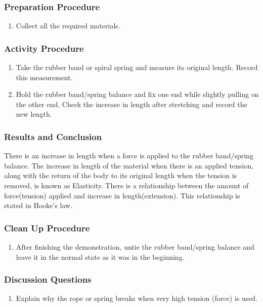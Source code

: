\subsubsection*{Preparation Procedure}
\begin{enumerate}
\item{Collect all the required materials.}
\end{enumerate}

\subsubsection*{Activity Procedure}
\begin{enumerate}
\item{Take the rubber band or spiral spring and measure its original length.  Record this measurement.} 
\item{Hold the rubber band/spring balance and fix one end while slightly pulling on the other end. Check the increase in length after stretching and record the new length.} 
\end{enumerate}

\subsubsection*{Results and Conclusion}
There is an increase in length when a force is applied to the rubber band/spring balance.  
The increase in length of the material when there is an applied tension, along with the return of the body to its original length when the tension is removed, is known as Elasticity.  
There is a relationship between the amount of force(tension) applied and increase in length(extension).  This relationship is stated in Hooke's law.  

\subsubsection*{Clean Up Procedure}
\begin{enumerate}
\item{After finishing the demonstration, untie the rubber band/spring balance and leave it in the normal state as it was in the beginning.} 
\end{enumerate}

\subsubsection*{Discussion Questions}
\begin{enumerate}
\item{Explain why the rope or spring breaks when very high tension (force) is used.} 
\end{enumerate}

